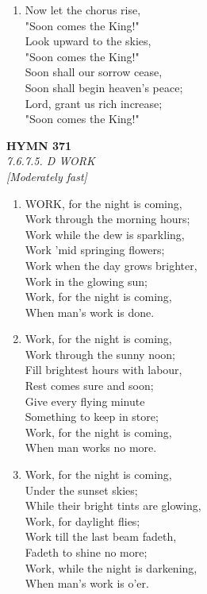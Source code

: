 \documentclass[11pt,a4paper]{article}
\begin{document}
\begin{enumerate}
    \item Now let the chorus rise, \\
        "Soon comes the King!" \\
        Look upward to the skies, \\
        "Soon comes the King!" \\
        Soon shall our sorrow cease, \\
        Soon shall begin heaven's peace; \\
        Lord, grant us rich increase; \\
        "Soon comes the King!"

\end{enumerate}

\newpage
\begin{center}
    {\Large \textbf{HYMN 371}}
    \\
    \textit{7.6.7.5. D WORK}
    \\
    \textit{\small [Moderately fast]}
\end{center}
\vspace{1em}

\begin{enumerate}
    \item WORK, for the night is coming, \\
        Work through the morning hours; \\
        Work while the dew is sparkling, \\
        Work 'mid springing flowers; \\
        Work when the day grows brighter, \\
        Work in the glowing sun; \\
        Work, for the night is coming, \\
        When man's work is done.

    \item Work, for the night is coming, \\
        Work through the sunny noon; \\
        Fill brightest hours with labour, \\
        Rest comes sure and soon; \\
        Give every flying minute \\
        Something to keep in store; \\
        Work, for the night is coming, \\
        When man works no more.

    \item Work, for the night is coming, \\
        Under the sunset skies; \\
        While their bright tints are glowing, \\
        Work, for daylight flies; \\
        Work till the last beam fadeth, \\
        Fadeth to shine no more; \\
        Work, while the night is darkening, \\
        When man's work is o'er.

\end{enumerate}
\end{document}
